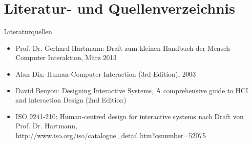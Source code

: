 

\chapter{Literatur- und Quellenverzeichnis}

Literaturquellen 
\begin{itemize}
\item
Prof. Dr. Gerhard Hartmann: Draft zum kleinen Handbuch der Mensch-Computer Interaktion, März 2013
\item
Alan Dix: Human-Computer Interaction (3rd Edition), 2003
\item 
David Benyon: Designing Interactive Systems, A comprehensive guide to HCI and interaction Design (2nd Edition) 
\item
ISO 9241-210: Human-centred design for interactive systems nach Draft von Prof. Dr. Hartmann,
\\http://www.iso.org/iso/catalogue\_detail.htm?csnumber=52075

\end{itemize}

